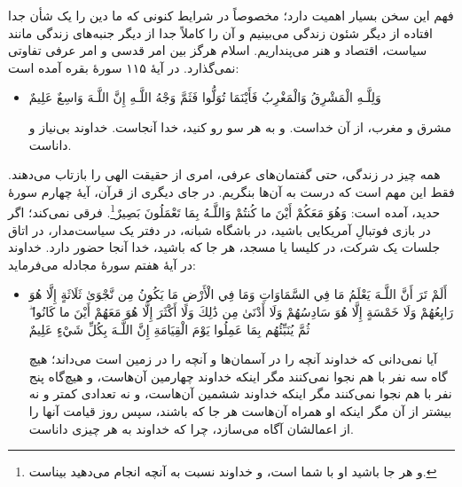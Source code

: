 فهم این سخن بسیار اهمیت دارد؛ مخصوصاً در شرایط کنونی که ما دین را یک شأن جدا افتاده از دیگر شئون زندگی می‌بینیم و آن را کاملاً جدا از دیگر جنبه‌های زندگی مانند سیاست، اقتصاد و هنر می‌پنداریم. اسلام هرگز بین امر قدسی و امر عرفی تفاوتی نمی‌گذارد. در آیهٔ ۱۱۵ سورهٔ بقره آمده است: 

\begin{itemize}
	\item[]
	
	{
		وَلِلَّـهِ الْمَشْرِقُ وَالْمَغْرِبُ  فَأَيْنَمَا تُوَلُّوا فَثَمَّ وَجْهُ اللَّـهِ  إِنَّ اللَّـهَ وَاسِعٌ عَلِيمٌ
	}
	
	{
		مشرق و مغرب، از آن خداست. و به هر سو رو کنید، خدا آنجاست. خداوند بی‌نیاز و داناست.
	}
\end{itemize}

همه چیز در زندگی، حتی گفتمان‌های عرفی، امری از حقیقت الهی را بازتاب می‌دهند. فقط این مهم است که درست به آن‌ها بنگریم. در جای دیگری از قرآن، آیهٔ چهارم سورهٔ حدید، آمده است:  { وَهُوَ مَعَكُمْ أَيْنَ ما كُنتُمْ  وَاللَّـهُ بِمَا تَعْمَلُونَ بَصِيرٌ}\footnote{و هر جا باشید او با شما است، و خداوند نسبت به آنچه انجام می‌دهید بیناست.}. فرقی نمی‌کند؛ اگر در بازی فوتبالِ آمریکایی باشید، در باشگاه شبانه، در دفتر یک سیاست‌مدار، در اتاق جلسات یک شرکت، در کلیسا یا مسجد، هر جا که باشید، خدا آنجا حضور دارد. خداوند در آیهٔ هفتم سورهٔ‌ مجادله می‌فرماید:

\begin{itemize}
	\item[]
	{
		أَلَمْ تَرَ أَنَّ اللَّـهَ يَعْلَمُ مَا فِي السَّمَاوَاتِ وَمَا فِي الْأَرْضِ مَا يَكُونُ مِن نَّجْوَىٰ ثَلَاثَةٍ إِلَّا هُوَ رَابِعُهُمْ وَلَا خَمْسَةٍ إِلَّا هُوَ سَادِسُهُمْ وَلَا أَدْنَىٰ مِن ذَٰلِكَ وَلَا أَكْثَرَ إِلَّا هُوَ مَعَهُمْ أَيْنَ ما كَانُوا ۖ ثُمَّ يُنَبِّئُهُم بِمَا عَمِلُوا يَوْمَ الْقِيَامَةِ إِنَّ اللَّـهَ بِكُلِّ شَيْءٍ عَلِيمٌ
	}
	
	{
		آیا نمی‌دانی که خداوند آنچه را در آسمان‌ها و آنچه را در زمین است می‌داند؛ هیچ گاه سه نفر با هم نجوا نمی‌کنند مگر اینکه خداوند چهارمین آن‌هاست، و هیچ‌گاه پنج نفر با هم نجوا نمی‌کنند مگر اینکه خداوند ششمین آن‌هاست، و نه تعدادی کمتر و نه بیشتر از آن مگر اینکه او همراه آن‌هاست هر جا که باشند، سپس روز قیامت آنها را از اعمالشان آگاه می‌سازد، چرا که خداوند به هر چیزی داناست. 
	}
\end{itemize}

